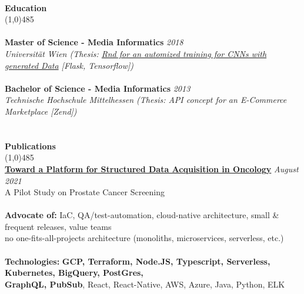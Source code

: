 \documentclass[9pt]{extarticle}
\newcommand\tab[1][1cm]{\hspace*{#1}}
\newcommand\smallspace[1][0.23cm]{\hspace*{#1}}
\newcommand\negativespace[1][-0.12cm]{\hspace*{#1}}
\begin{document}
\noindent %
\\
\vspace*{-6pt}
{\negativespace \Large \bf Education}\\
\line(1,0){485}\\
\\
\noindent
{\bf Master of Science - Media Informatics} \hfill \textit{2018} \\ 
\textit{Universität Wien (Thesis: \href{https://utheses.univie.ac.at/detail/48070/}{Rnd for an automized training for CNNs with generated Data} [Flask, Tensorflow])} \\\\
\noindent
{\bf Bachelor of Science - Media Informatics} \hfill \textit{2013} \\
\textit{Technische Hochschule Mittelhessen (Thesis: API concept for an E-Commerce Marketplace [Zend])} \\
\\
\\
\vspace*{-6pt}
{\negativespace \Large \bf Publications}\\
\line(1,0){485}\\
{\bf \href{https://www.researchgate.net/publication/354259954_Toward_a_Platform_for_Structured_Data_Acquisition_in_Oncology_A_Pilot_Study_on_Prostate_Cancer_Screening}{Toward a Platform for Structured Data Acquisition in Oncology}} \hfill \textit{August 2021} \\ 
A Pilot Study on Prostate Cancer Screening \\ 
\\

\noindent
{\bf Advocate of:}  IaC, QA/test-automation, cloud-native architecture, small \& frequent releases, value teams\\ 
 \tab \tab \smallspace no one-fits-all-projects architecture (monoliths, microservices, serverless, etc.) \\ \\
\noindent
{\bf Technologies:} \textbf{GCP, Terraform, Node.JS, Typescript, Serverless, Kubernetes, BigQuery, PostGres, \\ 
\tab \tab \smallspace  GraphQL, PubSub}, React, React-Native, AWS, Azure, Java, Python, ELK
\end{document}
